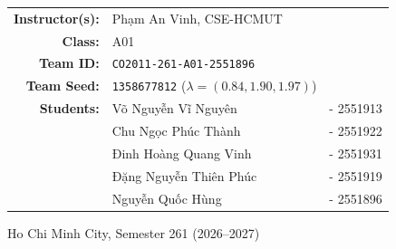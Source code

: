 \documentclass[a4paper,12pt]{article}
\begin{document}
\begin{titlepage}
\vspace{1.0cm}

\begin{center}
\begin{tabular}{r l l}
    \textbf{Instructor(s):} & Phạm An Vinh, CSE-HCMUT & \\
    \textbf{Class:}         & A01 & \\
    \textbf{Team ID:}       & \texttt{CO2011-261-A01-2551896} & \\
    \textbf{Team Seed:}     & \texttt{1358677812} \; ($\lambda = (0.84, 1.90, 1.97)$) & \\
    \textbf{Students:}      & Võ Nguyễn Vĩ Nguyên    & - 2551913 \\
                            & Chu Ngọc Phúc Thành    & - 2551922 \\
                            & Đinh Hoàng Quang Vinh  & - 2551931 \\
                            & Đặng Nguyễn Thiên Phúc & - 2551919 \\
                            & Nguyễn Quốc Hùng       & - 2551896 \\
\end{tabular}
\end{center}

\vfill

\begin{center}
    {\footnotesize Ho Chi Minh City, Semester 261 (2026--2027)}
\end{center}
\end{titlepage}
\restoregeometry

\thispagestyle{fancy}
\tableofcontents
\newpage

\setcounter{page}{1}


\newpage


\newpage



\newpage


\newpage


\newpage




\newpage
\appendix

\end{document}
